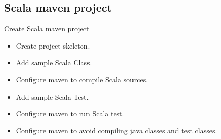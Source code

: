 \documentclass[aspectratio=169]{beamer}
\begin{document}
    \subsection{Scala maven project}\label{subsec:scala-maven-project}
    \begin{frame}{Create Scala maven project}
        \begin{itemize}[<+- | alert@+>]
            \item Create project skeleton.
            \item Add sample Scala Class.
            \item Configure maven to compile Scala sources.
            \item Add sample Scala Test.
            \item Configure maven to run Scala test.
            \item Configure maven to avoid compiling java classes and test classes.
        \end{itemize}
    \end{frame}
\end{document}
